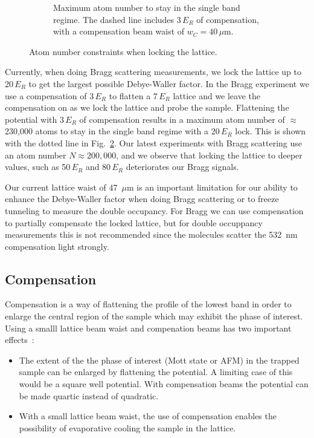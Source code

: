 \documentclass[11pt,letter]{article}
\begin{document}
\begin{figure}
\begin{subfigure}[t]{0.48\textwidth}
\caption{Maximum atom number to stay in the single band regime.  The dashed
line includes 3\,$E_{R}$ of compensation, with a compensation beam waist of
$w_{C}=40\,\mu$m.}
                \label{fig:lattice_lockB}
	\end{subfigure}%
	\caption{Atom number constraints when locking the
lattice.}\label{fig:lattice_lock}
\end{figure}

Currently, when doing Bragg
scattering measurements, we lock the lattice up to 20\,$E_{R}$ to get the
largest possible Debye-Waller factor.   In the Bragg experiment we use a
compensation of 3\,$E_{R}$ to flatten a 7\,$E_{R}$ lattice and we leave the
compensation on as we lock the lattice and probe the sample.  Flattening the
potential with  $3\,E_{R}$ of compensation results in a maximum atom number of
$\approx$230,000 atoms to stay in the single band regime with a 20\,$E_{R}$ lock. 
This is shown with the
dotted line in Fig.~\ref{fig:lattice_lock}.  Our latest experiments with Bragg
scattering use an atom number $N\approx200,000$, and we observe that locking
the lattice to deeper values, such as 50\,$E_{R}$ and 80\,$E_{R}$ deteriorates
our Bragg signals.

Our current lattice waist of 47~$\mu$m is an important limitation for our
ability to enhance the Debye-Waller factor when doing Bragg scattering or to
freeze tunneling to measure the double occupancy.  For Bragg we can use
compensation to partially compensate the locked lattice, but for double
occuppancy measurements this is not recommended since the molecules scatter the
532~nm compensation light strongly.   


\subsection{Compensation}
\label{subsec:compensation}

Compensation is a way of flattening the profile of the lowest band in order to
enlarge the central region of the sample which may exhibit the phase of
interest.   Using a smalll lattice beam waist and compenation beams has two
important effects~\cite{Mathy2012}:
\begin{itemize}
\item  The extent of the the phase of interest (Mott state or AFM) in the
trapped sample can be enlarged by flattening the potential.   A limiting case
of this would be a square well potential.  With compensation beams the
potential can be made quartic instead of quadratic.  
\item  With a small lattice beam waist, the use of compensation enables the
possibility of evaporative cooling the sample in the lattice.  
\end{itemize} 
\end{document}

